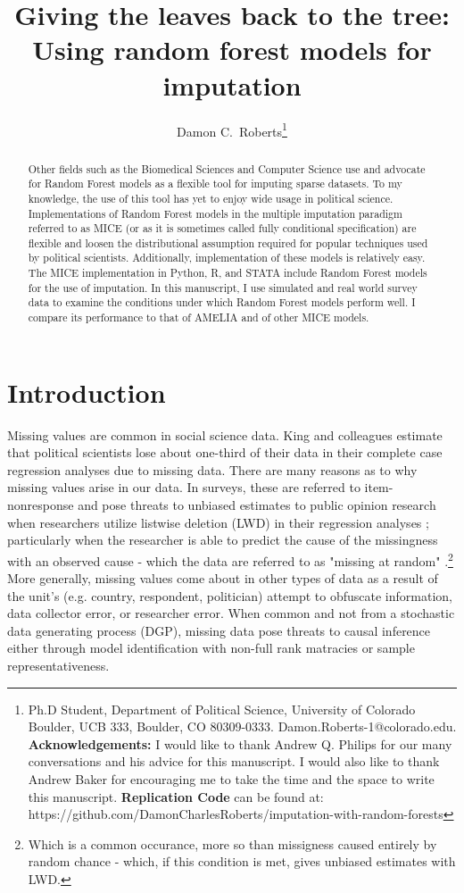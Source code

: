 \documentclass [12pt]{article}
\title{Giving the leaves back to the tree: Using random forest models for imputation}
\author{Damon C.\ Roberts\footnote{Ph.D Student,
Department of Political Science, University of Colorado Boulder, UCB 333, Boulder, CO 80309-0333. Damon.Roberts-1@colorado.edu. \newline \textbf{Acknowledgements:} I would like to thank Andrew Q. Philips for our many conversations and his advice for this manuscript. I would also like to thank Andrew Baker for encouraging me to take the time and the space to write this manuscript. \newline \textbf{Replication Code} can be found at: https://github.com/DamonCharlesRoberts/imputation-with-random-forests}}
\date{}
\begin{document}
\maketitle
\begin{abstract}
Other fields such as the Biomedical Sciences and Computer Science use and advocate for Random Forest models as a flexible tool for imputing sparse datasets. To my knowledge, the use of this tool has yet to enjoy wide usage in political science. Implementations of Random Forest models in the multiple imputation paradigm referred to as MICE (or as it is sometimes called fully conditional specification) are flexible and loosen the distributional assumption required for popular techniques used by political scientists. Additionally, implementation of these models is relatively easy. The MICE implementation in Python, R, and STATA include Random Forest models for the use of imputation. In this manuscript, I use simulated and real world survey data to examine the conditions under which Random Forest models perform well. I compare its performance to that of AMELIA and of other MICE models.
\end{abstract}

\newpage
\doublespace
\newpage
\section{Introduction}

Missing values are common in social science data. King and colleagues \citep{king_et-al_2001} estimate that political scientists lose about one-third of their data in their complete case regression analyses due to missing data. There are many reasons as to why missing values arise in our data. In surveys, these are referred to item-nonresponse and pose threats to unbiased estimates to public opinion research when researchers utilize listwise deletion (LWD) in their regression analyses \citep{weisberg_2005}; particularly when the researcher is able to predict the cause of the missingness with an observed cause - which the data are referred to as "missing at random" \citep{king_et-al_2001}.\footnote{Which is a common occurance, more so than missigness caused entirely by random chance - which, if this condition is met, gives unbiased estimates with LWD.} More generally, missing values come about in other types of data as a result of the unit's (e.g. country, respondent, politician) attempt to obfuscate information, data collector error, or researcher error.  When common and not from a stochastic data generating process (DGP), missing data pose threats to causal inference either through model identification with non-full rank matracies or sample representativeness. 
\end{document}
